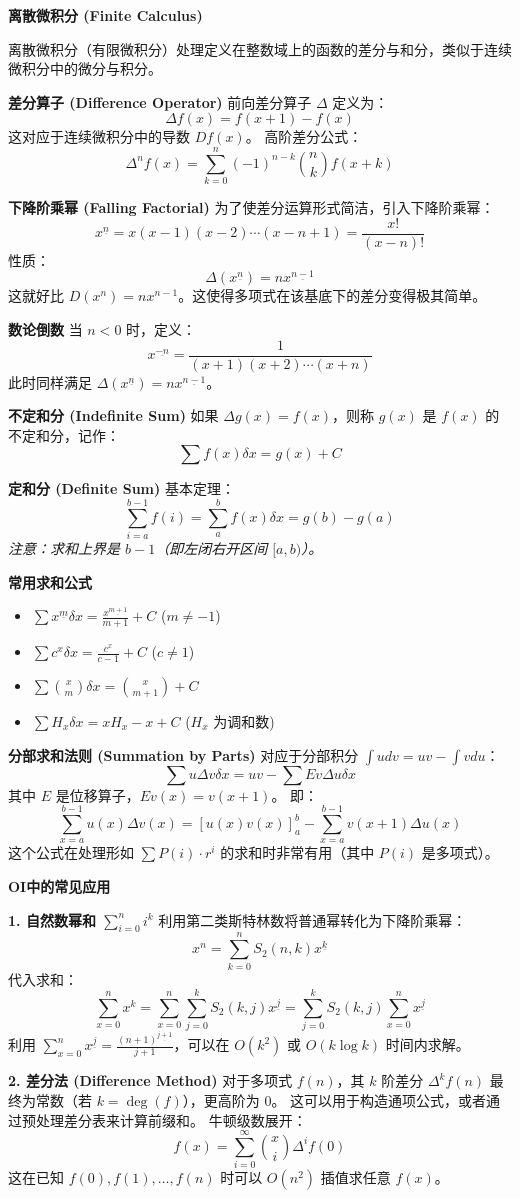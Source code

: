 \textbf{离散微积分 (Finite Calculus)}

离散微积分（有限微积分）处理定义在整数域上的函数的差分与和分，类似于连续微积分中的微分与积分。

\textbf{差分算子 (Difference Operator)}
前向差分算子 $\Delta$ 定义为：
\[
\Delta f(x) = f(x+1) - f(x)
\]
这对应于连续微积分中的导数 $D f(x)$。
高阶差分公式：
\[
\Delta^n f(x) = \sum_{k=0}^n (-1)^{n-k} \binom{n}{k} f(x+k)
\]

\textbf{下降阶乘幂 (Falling Factorial)}
为了使差分运算形式简洁，引入下降阶乘幂：
\[
x^{\underline{n}} = x(x-1)(x-2)\cdots(x-n+1) = \frac{x!}{(x-n)!}
\]
性质：
\[
\Delta (x^{\underline{n}}) = n x^{\underline{n-1}}
\]
这就好比 $D(x^n) = n x^{n-1}$。这使得多项式在该基底下的差分变得极其简单。

\textbf{数论倒数}
当 $n < 0$ 时，定义：
\[
x^{\underline{-n}} = \frac{1}{(x+1)(x+2)\cdots(x+n)}
\]
此时同样满足 $\Delta (x^{\underline{n}}) = n x^{\underline{n-1}}$。

\textbf{不定和分 (Indefinite Sum)}
如果 $\Delta g(x) = f(x)$，则称 $g(x)$ 是 $f(x)$ 的不定和分，记作：
\[
\sum f(x) \delta x = g(x) + C
\]

\textbf{定和分 (Definite Sum)}
基本定理：
\[
\sum_{i=a}^{b-1} f(i) = \sum_{a}^{b} f(x) \delta x = g(b) - g(a)
\]
\textit{注意：求和上界是 $b-1$（即左闭右开区间 $[a, b)$）。}

\textbf{常用求和公式}
\begin{itemize}
    \item $\sum x^{\underline{m}} \delta x = \frac{x^{\underline{m+1}}}{m+1} + C$ \quad ($m \neq -1$)
    \item $\sum c^x \delta x = \frac{c^x}{c-1} + C$ \quad ($c \neq 1$)
    \item $\sum \binom{x}{m} \delta x = \binom{x}{m+1} + C$
    \item $\sum H_x \delta x = x H_x - x + C$ \quad ($H_x$ 为调和数)
\end{itemize}

\textbf{分部求和法则 (Summation by Parts)}
对应于分部积分 $\int u dv = uv - \int v du$：
\[
\sum u \Delta v \delta x = uv - \sum E v \Delta u \delta x
\]
其中 $E$ 是位移算子，$Ev(x) = v(x+1)$。
即：
\[
\sum_{x=a}^{b-1} u(x) \Delta v(x) = [u(x)v(x)]_a^b - \sum_{x=a}^{b-1} v(x+1) \Delta u(x)
\]
这个公式在处理形如 $\sum P(i) \cdot r^i$ 的求和时非常有用（其中 $P(i)$ 是多项式）。

\textbf{OI中的常见应用}

\textbf{1. 自然数幂和 $\sum_{i=0}^n i^k$}
利用第二类斯特林数将普通幂转化为下降阶乘幂：
\[
x^n = \sum_{k=0}^n S_2(n,k) x^{\underline{k}}
\]
代入求和：
\[
\sum_{x=0}^n x^k = \sum_{x=0}^n \sum_{j=0}^k S_2(k, j) x^{\underline{j}} = \sum_{j=0}^k S_2(k, j) \sum_{x=0}^n x^{\underline{j}}
\]
利用 $\sum_{x=0}^n x^{\underline{j}} = \frac{(n+1)^{\underline{j+1}}}{j+1}$，可以在 $O(k^2)$ 或 $O(k \log k)$ 时间内求解。

\textbf{2. 差分法 (Difference Method)}
对于多项式 $f(n)$，其 $k$ 阶差分 $\Delta^k f(n)$ 最终为常数（若 $k = \deg(f)$），更高阶为 0。
这可以用于构造通项公式，或者通过预处理差分表来计算前缀和。
牛顿级数展开：
\[
f(x) = \sum_{i=0}^\infty \binom{x}{i} \Delta^i f(0)
\]
这在已知 $f(0), f(1), \dots, f(n)$ 时可以 $O(n^2)$ 插值求任意 $f(x)$。
